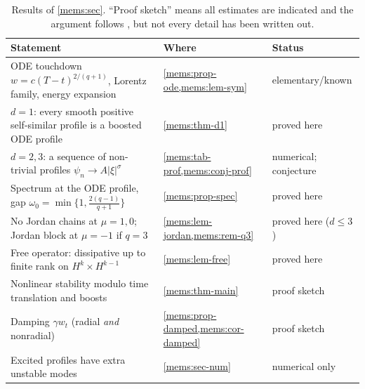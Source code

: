 \begin{table}[ht]
\centering\small
\begin{tabular}{@{}p{}p{}p{}@{}}
\toprule
\raggedright Statement & \raggedright Where & \raggedright Status \tabularnewline
\midrule
\raggedright ODE touchdown $w=c(T-t)^{2/(q+1)}$, Lorentz family, energy expansion & \raggedright \cref{mems:prop-ode,mems:lem-sym} & \raggedright elementary/known \tabularnewline
\raggedright $d=1$: every smooth positive self-similar profile is a boosted ODE profile & \raggedright \cref{mems:thm-d1} & \raggedright proved here \tabularnewline
\raggedright $d=2,3$: a sequence of non-trivial profiles $\psi_n\to A|\xi|^\sigma$ & \raggedright \cref{mems:tab-prof,mems:conj-prof} & \raggedright numerical; conjecture \tabularnewline
\raggedright Spectrum at the ODE profile, gap $\omega_0=\min\{1,\frac{2(q-1)}{q+1}\}$ & \raggedright \cref{mems:prop-spec} & \raggedright proved here \tabularnewline
\raggedright No Jordan chains at $\mu=1,0$; Jordan block at $\mu=-1$ if $q=3$ & \raggedright \cref{mems:lem-jordan,mems:rem-q3} & \raggedright proved here ($d\le3$) \tabularnewline
\raggedright Free operator: dissipative up to finite rank on $H^k\times H^{k-1}$ & \raggedright \cref{mems:lem-free} & \raggedright proved here \tabularnewline
\raggedright Nonlinear stability modulo time translation and boosts & \raggedright \cref{mems:thm-main} & \raggedright proof sketch \tabularnewline
\raggedright Damping $\gamma w_t$ (radial \emph{and} nonradial) & \raggedright \cref{mems:prop-damped,mems:cor-damped} & \raggedright proof sketch \tabularnewline
\raggedright Excited profiles have extra unstable modes & \raggedright \cref{mems:sec-num} & \raggedright numerical only \tabularnewline
\bottomrule

\end{tabular}
\caption{Results of \cref{mems:sec}. ``Proof sketch'' means all
estimates are indicated and the argument follows
\cite{DonningerSchoerkhuber2016,DonningerSchoerkhuber2017,Ostermann2024}, but
not every detail has been written out.}
\label{mems:tab-status}
\end{table}


